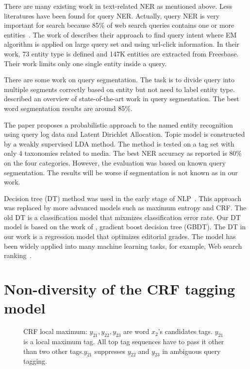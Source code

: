 \documentclass[11pt]{article}
\begin{document}
There are many existing work in text-related NER as mentioned above. Less literatures have been found for query NER. Actually, query NER is very important for search because 85\% of web search queries contains one or more entities~\cite{Lin:2012}. The work of \cite{Lin:2012,Pantel:2012:MET:2390524.2390603}  describes their approach to find query intent where EM algorithm is applied on large query set and using url-click information. In their work, 73 entity type is defined and 147K entities are extracted from Freesbase. Their work limits only one single entity inside a query. 

There are some work on query segmentation. The task is to divide query into multiple segments correctly based on entity but not need to label entity type.
\cite{Hagen:2012} described an overview of state-of-the-art work in query segmentation.  The best word segmentation results are around 85\%. 

The paper \cite{Guo:2009:NER} proposes a probabilistic approach to the named entity recognition using query log data and Latent Dirichlet Allocation. Topic model is constructed by a weakly supervised LDA method. The method is tested on a tag set with only 4 taxonomies related to media. The best NER accuracy as reported is 80\% on the four categories. However, the evaluation was based on known query segmentation. The results will be worse if segmentation is not known as in our work.



Decision tree (DT) method was used in the early stage of NLP~\cite{Black:1993,Magerman95statisticaldecision-tree}. This approach was replaced by more advanced models such as maximum entropy and CRF. The old DT is a classification model that mixmizes classification error rate.  Our DT model is based on the work of \cite{Friedman:2002,Ye:2009}, gradient boost decision tree (GBDT). The DT in our work is a regression model that optimizes editorial grades. The model has been widely applied into many machine learning tasks, for example, Web search ranking~\cite{Ye:2009}. 


\section{Non-diversity of the CRF tagging model}
\label{sec:crf}

\begin{figure*}
\centering
{}
\caption{CRF local maximum: $y_{21},y_{22},y_{23}$ are word $x_{2}$'s candidates tags. $y_{21}$ is a local maximum tag. All top tag sequences have to pass it other than two other tags.$y_{21}$ suppresses $y_{22}$ and $y_{23}$ in ambiguous query tagging.}
\label{fig:crflocal}
\end{figure*}
\end{document}

